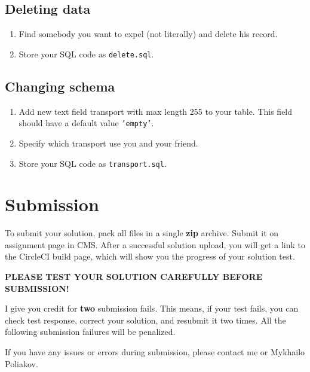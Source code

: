 \documentclass[12pt]{article}
\newcommand{\code}[1]{\texttt{#1}}
\begin{document}
\subsection*{Deleting data}

\begin{enumerate}

\item Find somebody you want to expel (not literally) and delete his record.

\item Store your SQL code as \code{delete.sql}.

\end{enumerate}

\subsection*{Changing schema}

\begin{enumerate}

\item Add new text field transport with max length 255 to your table. This field should have a default value \code{'empty'}.

\item Specify which transport use you and your friend.

\item Store your SQL code as \code{transport.sql}.

\end{enumerate}

\section*{Submission}

To submit your solution, pack all files in a single \textbf{zip} archive. Submit it on assignment page in CMS. After a successful solution upload, you will get a link to the CircleCI build page, which will show you the progress of your solution test.

\uppercase{\textbf{Please test your solution carefully before submission!}}

I give you credit for \textbf{two} submission fails. This means, if your test fails, you can check test response, correct your solution, and resubmit it two times. All the following submission failures will be penalized.

If you have any issues or errors during submission, please contact me or Mykhailo Poliakov.
\end{document}
